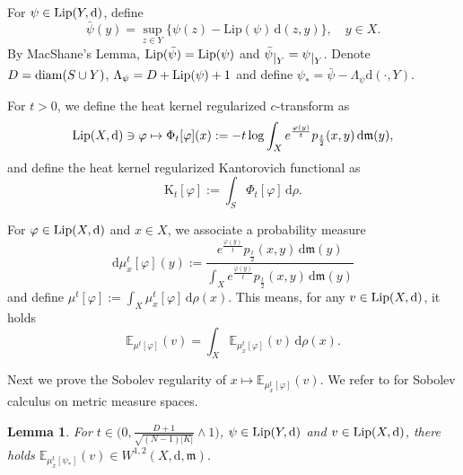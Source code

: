 \documentclass[a4paper,11pt]{article}
\numberwithin{equation}{section}
\theoremstyle{plain}
\newtheorem{lemma}[theorem]{Lemma}
\theoremstyle{definition}
\theoremstyle{remark}
\newcommand{\mm}{\mathfrak m}
\newcommand{\E}{\mathbb{E}}
\newcommand{\K}{\mathrm{K}}
\newcommand{\diam}{\mathop{\rm diam}\nolimits}
\newcommand{\Lip}{\mathop{\rm Lip}\nolimits}
\renewcommand{\d}{{\mathrm d}}
\newcommand{\restr}[1]{\lower3pt\hbox{$|_{#1}$}}
\begin{document}
For $\psi\in\Lip(Y,\d)$,  define 
	\begin{equation*}
	\bar \psi (y)= \sup_{z \in Y} \big\{ \psi(z) - \text{Lip}(\psi) \, \d(z, y) \big\},\quad y\in X.
	\end{equation*}
By MacShane's Lemma,   $\Lip(\bar\psi) =\Lip(\psi)$ and ${\bar\psi}\restr{Y} = \psi \restr Y$. 
	Denote $D=\diam(S\cup Y)$,  $\Lambda_\psi=D+ \Lip(\psi) + 1$ and  define $\psi_*={\bar \psi}-\Lambda_\psi \d(\cdot, Y)$.  
	
	For  $t>0$,  we define the heat kernel regularized $c$-transform as
	\begin{equation*}
\Lip(X, \d)\ni	\varphi\mapsto 	\Phi_t[\varphi](x):=-t \log \int_X e^{\frac{{\varphi}(y)}{t}} p_{\frac{t}{2}}(x, y)\, \d\mm(y),
	\end{equation*}
	and define the heat kernel regularized Kantorovich functional as
	\begin{equation*}
		\K_t[\varphi]:=\int_S \Phi_t[\varphi]\,\d\rho.
	\end{equation*}
	
	
	
	
	For $\varphi\in\Lip(X,\d)$ and $x\in X$, we associate a probability measure
	\begin{equation*}
		\d\mu_x^t[\varphi](y):=\frac{e^{\frac{\varphi(y)}{t}}p_\frac{t}{2}(x,y)\,\d\mm(y)}{\int_{X} e^{\frac{\varphi(y)}{t}} p_\frac{t}{2}(x,y)\,\d\mm(y)}
	\end{equation*}
and define  $	\mu^t[\varphi]:=\int_X \mu_x^t[\varphi]\, \d \rho(x)$.   This means,   for any $v\in\Lip(X,\d)$,  it holds
	\begin{equation}\label{mu}
	\E_{\mu^t[\varphi]}(v)=\int_X  \E_{\mu_x^t[\varphi]}(v) \,\d \rho(x).	
	\end{equation}
	
	
	Next we prove the Sobolev regularity of $x\mapsto \E_{\mu_x^t[\varphi]}(v)$.  We refer to \cite{ zbMATH06303881} for Sobolev calculus on metric measure spaces.  

		\begin{lemma}\label{Lemma3.3}
		For  $t\in \big(0,\frac{D+1}{\sqrt{(N-1)|K|}}\wedge1\big)$, $\psi\in\Lip(Y,\d)$ and  $v\in\Lip(X,\d)$,  there holds $\E_{\mu_x^t[\psi_*]}(v)\in W^{1,2}(X,\d,\mm)$.
	\end{lemma}
	
\end{document}
